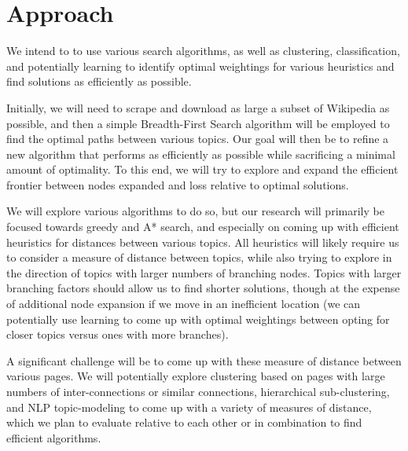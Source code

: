 \documentclass[11pt]{article}
\begin{document}
\section{Approach}

We intend to to use various search algorithms, as well as clustering, classification, and potentially learning to identify optimal weightings for various heuristics and find solutions as efficiently as possible.

Initially, we will need to scrape and download as large a subset of Wikipedia as possible, and then a simple Breadth-First Search algorithm will be employed to find the optimal paths between various topics. Our goal will then be to refine a new algorithm that performs as efficiently as possible while sacrificing a minimal amount of optimality. To this end, we will try to explore and expand the efficient frontier between nodes expanded and loss relative to optimal solutions.

We will explore various algorithms to do so, but our research will primarily be focused towards greedy and A* search, and especially on coming up with efficient heuristics for distances between various topics. All heuristics will likely require us to consider a measure of distance between topics, while also trying to explore in the direction of topics with larger numbers of branching nodes. Topics with larger branching factors should allow us to find shorter solutions, though at the expense of additional node expansion if we move in an inefficient location (we can potentially use learning to come up with optimal weightings between opting for closer topics versus ones with more branches).

A significant challenge will be to come up with these measure of distance between various pages. We will potentially explore clustering based on pages with large numbers of inter-connections or similar connections, hierarchical sub-clustering, and NLP topic-modeling to come up with a variety of measures of distance, which we plan to evaluate relative to each other or in combination to find efficient algorithms.



\end{document}
